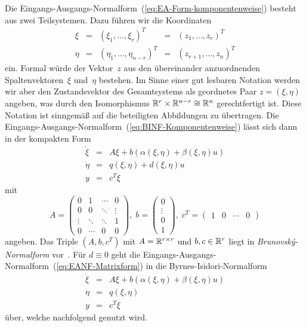 Die Eingangs-Ausgangs-Normalform~(\ref{eq:EA-Form-komponentenweise})
besteht aus zwei Teilsystemen. Dazu führen wir die Koordinaten 
\[
\begin{array}{lclcl}
\xi & = & (\xi_{1},\ldots,\xi_{r})^{T} & = & (z_{1},\ldots,z_{r})^{T}\\
\eta & = & (\eta_{1},\ldots,\eta_{n-r})^{T} & = & (z_{r+1},\ldots,z_{n})^{T}
\end{array}
\]
ein. Formal würde der Vektor~$z$ aus den übereinander anzuordnenden
Spaltenvektoren~$\xi$ und~$\eta$ bestehen. Im Sinne einer gut
lesbaren Notation werden wir aber den Zustandsvektor des Gesamtsystems
als geordnetes Paar $z=(\xi,\eta)$ angeben, was durch den Isomorphismus
${\mathbb{R}}^{r}\times{\mathbb{R}}^{n-r}\cong{\mathbb{R}}^{n}$ gerechtfertigt ist. Diese Notation
ist sinngemäß auf die beteiligten Abbildungen zu übertragen. Die Eingangs-Ausgangs-Normalform~(\ref{eq:BINF-Komponentenweise})
lässt sich dann in der kompakten Form 
\begin{equation}
\begin{array}{rcl}
\dot{\xi} & = & A\xi+b(\alpha(\xi,\eta)+\beta(\xi,\eta)u)\\
\dot{\eta} & = & q(\xi,\eta)+d(\xi,\eta)u\\
y & = & c^{T}\xi
\end{array}\label{eq:EANF-Matrixform}
\end{equation}
mit 
\begin{equation}
A=\left(\begin{array}{cccc}
0 & 1 & \cdots & 0\\
0 & 0 & \ddots & \vdots\\
\vdots & \ddots & \ddots & 1\\
0 & \cdots & 0 & 0
\end{array}\right),\;b=\left(\begin{array}{c}
0\\
\vdots\\
0\\
1
\end{array}\right),\;c^{T}=\left(\begin{array}{cccc}
1 & 0 & \cdots & 0\end{array}\right)\label{eq:Abc-Brunovsky}
\end{equation}
angeben. Das Triple $(A,b,c^{T})$ mit $A={\mathbb{R}}^{r\times r}$ und $b,c\in{\mathbb{R}}^{r}$
liegt in \emph{Brunovský-Normalform}
vor~\cite{brunovsky70}. Für $d\equiv0$ geht die Eingangs-Ausgangs-Normalform~(\ref{eq:EANF-Matrixform})
in die Byrnes-Isidori-Normalform
\begin{equation}
\begin{array}{rcl}
\dot{\xi} & = & A\xi+b(\alpha(\xi,\eta)+\beta(\xi,\eta)u)\\
\dot{\eta} & = & q(\xi,\eta)\\
y & = & c^{T}\xi
\end{array}\label{eq:BINF-Matrixform}
\end{equation}
über, welche nachfolgend genutzt wird.


